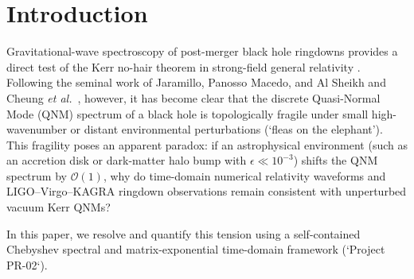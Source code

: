 \documentclass[11pt,a4paper]{article}
\begin{document}
\section{Introduction}
Gravitational-wave spectroscopy of post-merger black hole ringdowns provides a direct test of the Kerr no-hair theorem in strong-field general relativity \cite{Berti:2009kk}. Following the seminal work of Jaramillo, Panosso Macedo, and Al Sheikh \cite{Jaramillo:2020pseudospectrum} and Cheung \textit{et al.}\ \cite{Cheung:2021fleas}, however, it has become clear that the discrete Quasi-Normal Mode (QNM) spectrum of a black hole is topologically fragile under small high-wavenumber or distant environmental perturbations (`fleas on the elephant'). This fragility poses an apparent paradox: if an astrophysical environment (such as an accretion disk or dark-matter halo bump with $\epsilon \ll 10^{-3}$) shifts the QNM spectrum by $\mathcal{O}(1)$, why do time-domain numerical relativity waveforms and LIGO--Virgo--KAGRA ringdown observations remain consistent with unperturbed vacuum Kerr QNMs?

In this paper, we resolve and quantify this tension using a self-contained Chebyshev spectral and matrix-exponential time-domain framework (`Project PR-02`).
\end{document}
